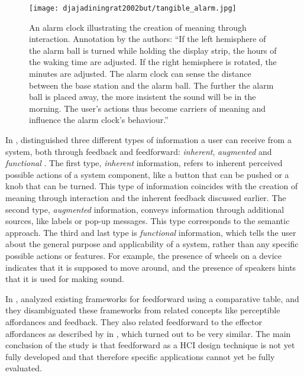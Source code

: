\begin{figure}
    \centering
    \texttt{[image: djajadiningrat2002but/tangible\_alarm.jpg]}
    \caption{An alarm clock illustrating the creation of meaning through interaction. Annotation by the authors: ``If the left hemisphere of the alarm ball is turned while holding the display strip, the hours of the waking time are adjusted. If the right hemisphere is rotated, the minutes are adjusted. The alarm clock can sense the distance between the base station and the alarm ball. The further the alarm ball is placed away, the more insistent the sound will be in the morning. The user's actions thus become carriers of meaning and influence the alarm clock's behaviour.'' \cite{djajadiningrat2002but}}
    \label{fig:djajadiningrat2002but_tangible_alarm}
\end{figure}

In \citeyear{wensveen2004interaction}, \citeauthor{wensveen2004interaction} distinguished three different types of information a user can receive from a system, both through feedback and feedforward: \textit{inherent}, \textit{augmented} and \textit{functional} \cite{wensveen2004interaction}. The first type, \textit{inherent} information, refers to inherent perceived possible actions of a system component, like a button that can be pushed or a knob that can be turned. This type of information coincides with the creation of meaning through interaction and the inherent feedback discussed earlier. The second type, \textit{augmented} information, conveys information through additional sources, like labels or pop-up messages. This type corresponds to the semantic approach. The third and last type is \textit{functional} information, which tells the user about the general purpose and applicability of a system, rather than any specific possible actions or features. For example, the presence of wheels on a device indicates that it is supposed to move around, and the presence of speakers hints that it is used for making sound.

In \citeyear{vermeulen2013crossing}, \citeauthor{vermeulen2013crossing} analyzed existing frameworks for feedforward using a comparative table, and they disambiguated these frameworks from related concepts like perceptible affordances and feedback. They also related feedforward to the effector affordances as described by \citeauthor{kaptelinin2012affordances} in \citeyear{kaptelinin2012affordances}, which turned out to be very similar. The main conclusion of the study is that feedforward as a HCI design technique is not yet fully developed and that therefore specific applications cannot yet be fully evaluated.

